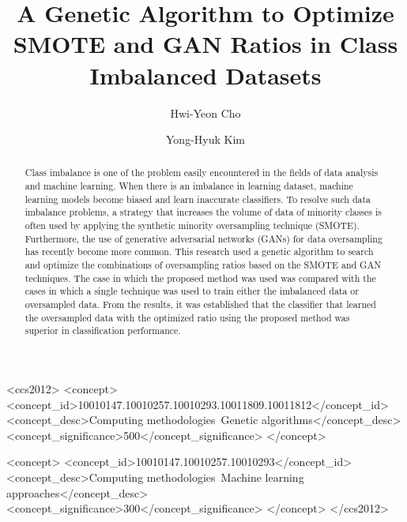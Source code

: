 \documentclass[sigconf]{acmart}
\begin{document}
\title{A Genetic Algorithm to Optimize SMOTE and GAN Ratios in Class Imbalanced Datasets}


\author{Hwi-Yeon Cho}

\author{Yong-Hyuk Kim}

\renewcommand{\shortauthors}{H.-Y. Cho et al.}


\begin{abstract}
Class imbalance is one of the problem easily encountered in the fields of data analysis and machine learning.
When there is an imbalance in learning dataset, machine learning models become biased and learn inaccurate classifiers.
To resolve such data imbalance problems, a strategy that increases the volume of data of minority classes is often used by applying the synthetic minority oversampling technique (SMOTE).
Furthermore, the use of generative adversarial networks (GANs) for data oversampling has recently become more common.
This research used a genetic algorithm to search and optimize the combinations of oversampling ratios based on the SMOTE and GAN techniques.
The case in which the proposed method was used was compared with the cases in which a single technique was used to train either the imbalanced data or oversampled data.
From the results, it was established that the classifier that learned the oversampled data with the optimized ratio using the proposed method was superior in classification performance.
\end{abstract}


%
%
\begin{CCSXML}
<ccs2012>
    <concept>
        <concept_id>10010147.10010257.10010293.10011809.10011812</concept_id>
        <concept_desc>Computing methodologies~Genetic algorithms</concept_desc>
        <concept_significance>500</concept_significance>
    </concept>

    <concept>
       <concept_id>10010147.10010257.10010293</concept_id>
       <concept_desc>Computing methodologies~Machine learning approaches</concept_desc>
       <concept_significance>300</concept_significance>
    </concept>
</ccs2012>
\end{CCSXML}
\end{document}
